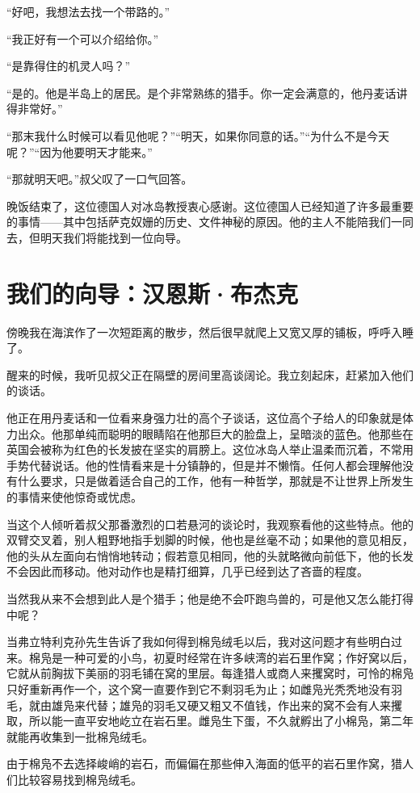 \documentclass[10pt]{book}
\begin{document}
“好吧，我想法去找一个带路的。”

“我正好有一个可以介绍给你。”

“是靠得住的机灵人吗？”

“是的。他是半岛上的居民。是个非常熟练的猎手。你一定会满意的，他丹麦话讲得非常好。”

“那末我什么时候可以看见他呢？”“明天，如果你同意的话。”“为什么不是今天呢？”“因为他要明天才能来。”

“那就明天吧。”叔父叹了一口气回答。

晚饭结束了，这位德国人对冰岛教授衷心感谢。这位德国人已经知道了许多最重要的事情——其中包括萨克奴姗的历史、文件神秘的原因。他的主人不能陪我们一同去，但明天我们将能找到一位向导。
\chapter{我们的向导：汉恩斯·布杰克}
傍晚我在海滨作了一次短距离的散步，然后很早就爬上又宽又厚的铺板，呼呼入睡了。

醒来的时候，我听见叔父正在隔壁的房间里高谈阔论。我立刻起床，赶紧加入他们的谈话。

他正在用丹麦话和一位看来身强力壮的高个子谈话，这位高个子给人的印象就是体力出众。他那单纯而聪明的眼睛陷在他那巨大的脸盘上，呈暗淡的蓝色。他那些在英国会被称为红色的长发披在坚实的肩膀上。这位冰岛人举止温柔而沉着，不常用手势代替说话。他的性情看来是十分镇静的，但是并不懒惰。任何人都会理解他没有什么要求，只是做着适合自己的工作，他有一种哲学，那就是不让世界上所发生的事情来使他惊奇或忧虑。

当这个人倾听着叔父那番激烈的口若悬河的谈论时，我观察看他的这些特点。他的双臂交叉着，别人粗野地指手划脚的时候，他也是丝毫不动；如果他的意见相反，他的头从左面向右悄悄地转动；假若意见相同，他的头就略微向前低下，他的长发不会因此而移动。他对动作也是精打细算，几乎已经到达了吝啬的程度。

当然我从来不会想到此人是个猎手；他是绝不会吓跑鸟兽的，可是他又怎么能打得中呢？

当弗立特利克孙先生告诉了我如何得到棉凫绒毛以后，我对这问题才有些明白过来。棉凫是一种可爱的小鸟，初夏时经常在许多峡湾的岩石里作窝；作好窝以后，它就从前胸拔下美丽的羽毛铺在窝的里层。每逢猎人或商人来攫窝时，可怜的棉凫只好重新再作一个，这个窝一直要作到它不剩羽毛为止；如雌凫光秃秃地没有羽毛，就由雄凫来代替；雄凫的羽毛又硬又粗又不值钱，作出来的窝不会有人来攫取，所以能一直平安地屹立在岩石里。雌凫生下蛋，不久就孵出了小棉凫，第二年就能再收集到一批棉凫绒毛。

由于棉凫不去选择峻峭的岩石，而偏偏在那些伸入海面的低平的岩石里作窝，猎人们比较容易找到棉凫绒毛。
\end{document}
